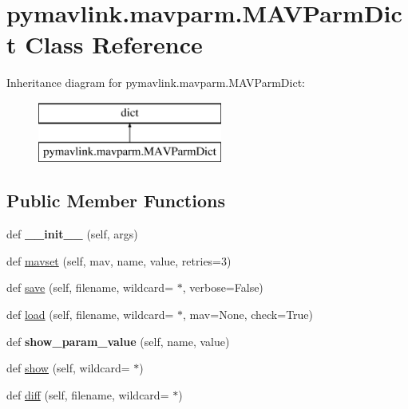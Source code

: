 \hypertarget{classpymavlink_1_1mavparm_1_1MAVParmDict}{}\section{pymavlink.\+mavparm.\+M\+A\+V\+Parm\+Dict Class Reference}
\label{classpymavlink_1_1mavparm_1_1MAVParmDict}
Inheritance diagram for pymavlink.\+mavparm.\+M\+A\+V\+Parm\+Dict\+:\begin{figure}[H]
\begin{center}
\leavevmode
\includegraphics[height=2.000000cm]{classpymavlink_1_1mavparm_1_1MAVParmDict}
\end{center}
\end{figure}
\subsection*{Public Member Functions}
\begin{DoxyCompactItemize}
\item 
\mbox{\label{classpymavlink_1_1mavparm_1_1MAVParmDict_a5b1891e1bca403f570f61d06fd153d53}} 
def {\bfseries \+\_\+\+\_\+init\+\_\+\+\_\+} (self, args)
\item 
def \hyperlink{classpymavlink_1_1mavparm_1_1MAVParmDict_aa041ae6aca1eaf554e068912dfd56cae}{mavset} (self, mav, name, value, retries=3)
\item 
def \hyperlink{classpymavlink_1_1mavparm_1_1MAVParmDict_a0f942689bbd320e3bf8201cb5b343ce0}{save} (self, filename, wildcard=\textquotesingle{} $\ast$\textquotesingle{}, verbose=False)
\item 
def \hyperlink{classpymavlink_1_1mavparm_1_1MAVParmDict_a08dd4eae81157f5940a29c86114f89c4}{load} (self, filename, wildcard=\textquotesingle{} $\ast$\textquotesingle{}, mav=None, check=True)
\item 
\mbox{\label{classpymavlink_1_1mavparm_1_1MAVParmDict_af2060e1b0249698bb61e841c1e923fb5}} 
def {\bfseries show\+\_\+param\+\_\+value} (self, name, value)
\item 
def \hyperlink{classpymavlink_1_1mavparm_1_1MAVParmDict_a94a75c918aa0bbb2ef0b2562b9fa554e}{show} (self, wildcard=\textquotesingle{} $\ast$\textquotesingle{})
\item 
def \hyperlink{classpymavlink_1_1mavparm_1_1MAVParmDict_a61470ddc60a053270b7cc6ed8639f7c8}{diff} (self, filename, wildcard=\textquotesingle{} $\ast$\textquotesingle{})
\end{DoxyCompactItemize}
